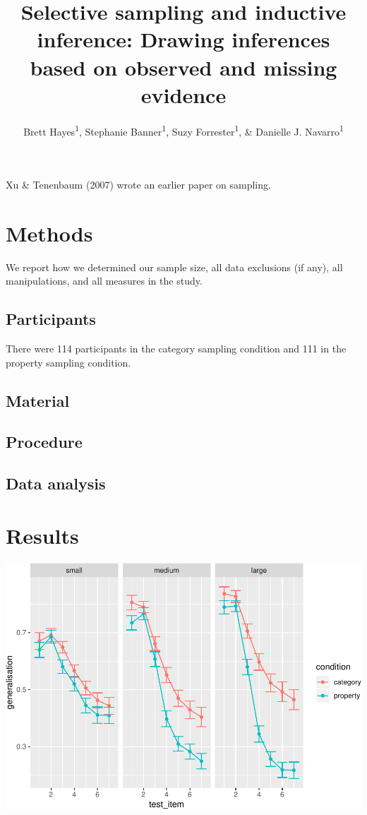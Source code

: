 \documentclass[
  man,floatsintext]{apa6}
\affiliation{
\vspace{0.5cm}
\textsuperscript{1} University of New South Wales, Australia}
\title{Selective sampling and inductive inference: Drawing inferences based on observed and missing evidence}
\author{Brett Hayes\textsuperscript{1}, Stephanie Banner\textsuperscript{1}, Suzy Forrester\textsuperscript{1}, \& Danielle J. Navarro\textsuperscript{1}}
\date{}
\begin{document}
\maketitle

Xu \& Tenenbaum (2007) wrote an earlier paper on sampling.

\hypertarget{methods}{%
\section{Methods}\label{methods}}

We report how we determined our sample size, all data exclusions (if any), all manipulations, and all measures in the study.

\hypertarget{participants}{%
\subsection{Participants}\label{participants}}

There were 114 participants in the category sampling condition and 111 in the property sampling condition.

\hypertarget{material}{%
\subsection{Material}\label{material}}

\hypertarget{procedure}{%
\subsection{Procedure}\label{procedure}}

\hypertarget{data-analysis}{%
\subsection{Data analysis}\label{data-analysis}}

\hypertarget{results}{%
\section{Results}\label{results}}

\includegraphics{samplingframes_files/figure-latex/samplesize_plot-1.pdf}
\end{document}
